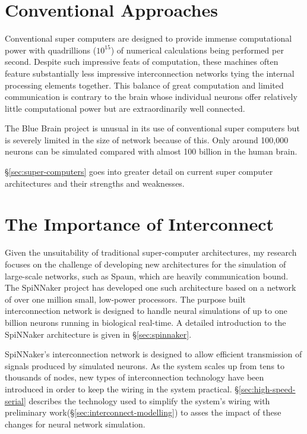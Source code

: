 	\section{Conventional Approaches}
	
		
		Conventional super computers are designed to provide immense computational
		power with quadrillions ($10^{15}$) of numerical calculations being
		performed per second. Despite such impressive feats of computation, these
		machines often feature substantially less impressive interconnection
		networks tying the internal processing elements together. This balance of
		great computation and limited communication is contrary to the brain whose
		individual neurons offer relatively little computational power but are
		extraordinarily well connected.
		
		The Blue Brain project is unusual in its use of conventional super computers
		but is severely limited in the size of network because of this.  Only around
		100,000 neurons can be simulated compared with almost 100 billion in the
		human brain.
		
		\S\ref{sec:super-computers} goes into greater detail on current super
		computer architectures and their strengths and weaknesses.
	
	\section{The Importance of Interconnect}
		
		Given the unsuitability of traditional super-computer architectures, my
		research focuses on the challenge of developing new architectures for the
		simulation of large-scale networks, such as Spaun, which are heavily
		communication bound.  The SpiNNaker project \cite{furber06} has developed
		one such architecture based on a network of over one million small,
		low-power processors. The purpose built interconnection network is designed
		to handle neural simulations of up to one billion neurons running in
		biological real-time. A detailed introduction to the SpiNNaker architecture
		is given in \S\ref{sec:spinnaker}.
		
		SpiNNaker's interconnection network is designed to allow efficient
		transmission of signals produced by simulated neurons. As the system scales
		up from tens to thousands of nodes, new types of interconnection technology
		have been introduced in order to keep the wiring in the system practical.
		\S\ref{sec:high-speed-serial} describes the technology used to simplify the
		system's wiring with preliminary work(\S\ref{sec:interconnect-modelling}) to
		asses the impact of these changes for neural network simulation.
		
